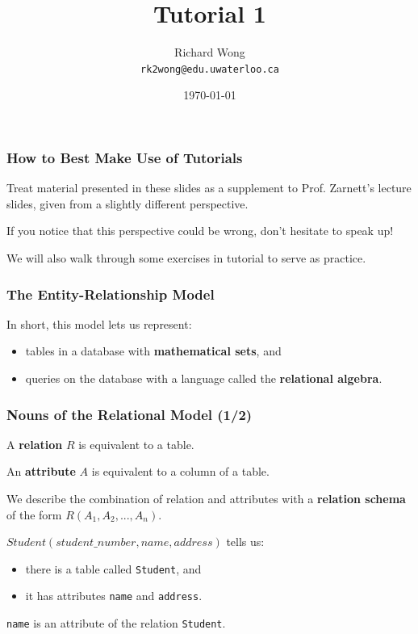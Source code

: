 

\title{Tutorial 1}

\author{Richard Wong \\ \small \texttt{rk2wong@edu.uwaterloo.ca}}
\date{\today}




\begin{frame}
  \titlepage

\end{frame}


\begin{frame}
\frametitle{How to Best Make Use of Tutorials}

Treat material presented in these slides as a supplement to Prof. Zarnett's lecture slides, given from a slightly different perspective.

If you notice that this perspective could be wrong, don't hesitate to speak up!

We will also walk through some exercises in tutorial to serve as practice.

\end{frame}

\begin{frame}
\frametitle{The Entity-Relationship Model}

In short, this model lets us represent:\\
\begin{itemize}
  \item tables in a database with \textbf{mathematical sets}, and
  \item queries on the database with a language called the \textbf{relational algebra}.
\end{itemize}

\end{frame}


\begin{frame}
\frametitle{Nouns of the Relational Model (1/2)}

A \textbf{relation} $R$ is equivalent to a table.

An \textbf{attribute} $A$ is equivalent to a column of a table.

We describe the combination of relation and attributes with a \textbf{relation schema} of the form $R(A_1, A_2, ... , A_n)$.

$Student(student\_number, name, address)$ tells us:\\
\begin{itemize}
  \item there is a table called \texttt{Student}, and
  \item it has attributes \texttt{name} and \texttt{address}.
\end{itemize}

\texttt{name} is an attribute of the relation \texttt{Student}.

\end{frame}

